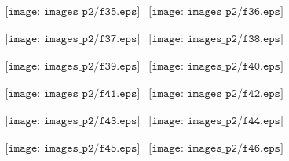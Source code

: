 \documentclass[a4paper,10pt]{article}
\begin{document}
\begin{figure}[h]
\begin{center}$
\begin{array}{cc}
\texttt{[image: images\_p2/f35.eps]} &
\texttt{[image: images\_p2/f36.eps]}
\end{array}$
\end{center}
\end{figure}

\begin{figure}[h]
\begin{center}$
\begin{array}{cc}
\texttt{[image: images\_p2/f37.eps]} &
\texttt{[image: images\_p2/f38.eps]}
\end{array}$
\end{center}
\end{figure}

\begin{figure}[h]
\begin{center}$
\begin{array}{cc}
\texttt{[image: images\_p2/f39.eps]} &
\texttt{[image: images\_p2/f40.eps]}
\end{array}$
\end{center}
\end{figure}

\begin{figure}[h]
\begin{center}$
\begin{array}{cc}
\texttt{[image: images\_p2/f41.eps]} &
\texttt{[image: images\_p2/f42.eps]}
\end{array}$
\end{center}
\end{figure}

\begin{figure}[h]
\begin{center}$
\begin{array}{cc}
\texttt{[image: images\_p2/f43.eps]} &
\texttt{[image: images\_p2/f44.eps]}
\end{array}$
\end{center}
\end{figure}

\begin{figure}[h]
\begin{center}$
\begin{array}{cc}
\texttt{[image: images\_p2/f45.eps]} &
\texttt{[image: images\_p2/f46.eps]}
\end{array}$
\end{center}
\end{figure}
\end{document}
